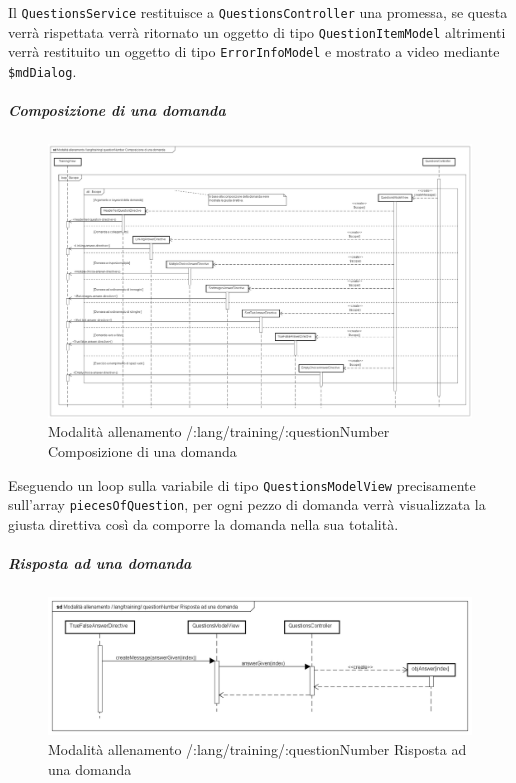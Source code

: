 Il \texttt{QuestionsService} restituisce a \texttt{QuestionsController} una promessa, se questa verrà rispettata verrà ritornato un oggetto di tipo \texttt{QuestionItemModel} altrimenti verrà restituito un oggetto di tipo \texttt{ErrorInfoModel} e mostrato a video mediante \texttt{\$mdDialog}.


\subparagraph{Composizione di una domanda}

\label{Modalità allenamento /:lang/training/:questionNumber Composizione di una domanda}

\begin{figure}[ht]
	\centering
	\includegraphics[scale=0.25,keepaspectratio]{UML/DiagrammiDiSequenza/Front-End/Training_makingAQuestion.png}
	\caption{Modalità allenamento /:lang/training/:questionNumber Composizione di una domanda}
\end{figure} \FloatBarrier

Eseguendo un loop sulla variabile di tipo \texttt{QuestionsModelView} precisamente sull'array \texttt{piecesOfQuestion}, per ogni pezzo di domanda verrà visualizzata la giusta direttiva così da comporre la domanda nella sua totalità.

\subparagraph{Risposta ad una domanda}

\label{Modalità allenamento /:lang/training/:questionNumber Risposta ad una domanda}

\begin{figure}[ht]
	\centering
	\includegraphics[scale=0.4,keepaspectratio]{UML/DiagrammiDiSequenza/Front-End/Training_answerAQuestion.png}
	\caption{Modalità allenamento /:lang/training/:questionNumber Risposta ad una domanda}
\end{figure} \FloatBarrier


